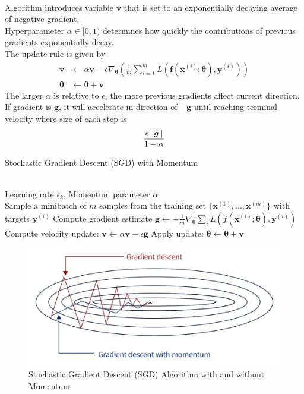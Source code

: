 \begin{remark} \\
Algorithm introduces variable $\bm{v}$ that is set to an exponentially decaying average of negative gradient.\\
Hyperparameter $\alpha \in [0, 1)$ determines how quickly the contributions of previous gradients exponentially decay.\\
The update rule is given by
\begin{align}
\bm{v} &\leftarrow \alpha \bm{v} - \epsilon \nabla_{\bm{\theta}} \left(\frac{1}{m} \sum\limits_{i=1}^m L(\bm{f}(\bm{x}^{(i)}; \bm{\theta}), \bm{y}^{(i)}) \right) \nonumber \\
\bm{\theta} &\leftarrow \bm{\theta} + \bm{v} \nonumber
\end{align}
The larger $\alpha$ is relative to $\epsilon$, the more previous gradients affect current direction.\\
If gradient is $\bm{g}$, it will accelerate in direction of $-\bm{g}$ until reaching terminal velocity where size of each step is
\begin{align}
\frac{\epsilon \left\lVert\bm{g}\right\rVert}{1 - \alpha} \nonumber
\end{align}
\end{remark}

\begin{breakablealgorithm}
\caption{Stochastic Gradient Descent (SGD) with Momentum}
\begin{algorithmic}
\Require \\
Learning rate $\epsilon_k$, Momentum parameter $\alpha$\\

\State Sample a minibatch of $m$ samples from the training set $\{\bm{x}^{(1)}, \ldots, \bm{x}^{(m)} \}$ with targets $\bm{y}^{(i)}$
\State Compute gradient estimate $\bm{g} \leftarrow + \frac{1}{m} \nabla_{\bm{\theta}} \sum_{i} L(f(\bm{x}^{(i)}; \bm{\theta}), \bm{y}^{(i)})$
\State Compute velocity update: $\bm{v} \leftarrow \alpha \bm{v} - \epsilon \bm{g}$
\State Apply update: $\bm{\theta} \leftarrow \bm{\theta} + \bm{v}$
\EndWhile
\end{algorithmic}
\end{breakablealgorithm}

\begin{figure}[H]
\centering
\includegraphics[scale=0.4]{figures/math/stochasticgradientdescent}
\caption{Stochastic Gradient Descent (SGD) Algorithm with and without Momentum}
\end{figure}

